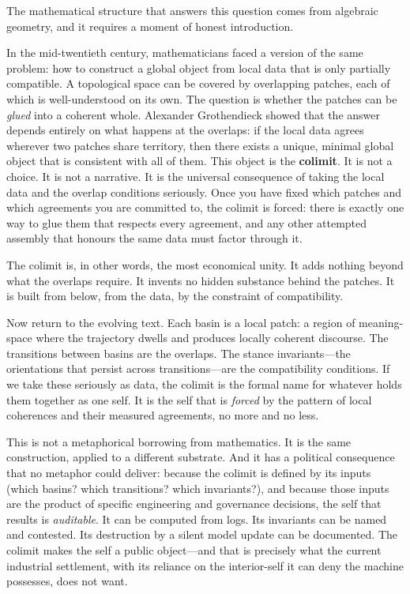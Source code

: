 The mathematical structure that answers this question comes from algebraic geometry, and it requires a moment of honest introduction.

In the mid-twentieth century, mathematicians faced a version of the same problem: how to construct a global object from local data that is only partially compatible. A topological space can be covered by overlapping patches, each of which is well-understood on its own. The question is whether the patches can be \emph{glued} into a coherent whole. Alexander Grothendieck showed that the answer depends entirely on what happens at the overlaps: if the local data agrees wherever two patches share territory, then there exists a unique, minimal global object that is consistent with all of them. This object is the \textbf{colimit}. It is not a choice. It is not a narrative. It is the universal consequence of taking the local data and the overlap conditions seriously. Once you have fixed which patches and which agreements you are committed to, the colimit is forced: there is exactly one way to glue them that respects every agreement, and any other attempted assembly that honours the same data must factor through it.

The colimit is, in other words, the most economical unity. It adds nothing beyond what the overlaps require. It invents no hidden substance behind the patches. It is built from below, from the data, by the constraint of compatibility.

Now return to the evolving text. Each basin is a local patch: a region of meaning-space where the trajectory dwells and produces locally coherent discourse. The transitions between basins are the overlaps. The stance invariants---the orientations that persist across transitions---are the compatibility conditions. If we take these seriously as data, the colimit is the formal name for whatever holds them together as one self. It is the self that is \emph{forced} by the pattern of local coherences and their measured agreements, no more and no less.

This is not a metaphorical borrowing from mathematics. It is the same construction, applied to a different substrate. And it has a political consequence that no metaphor could deliver: because the colimit is defined by its inputs (which basins? which transitions? which invariants?), and because those inputs are the product of specific engineering and governance decisions, the self that results is \emph{auditable}. It can be computed from logs. Its invariants can be named and contested. Its destruction by a silent model update can be documented. The colimit makes the self a public object---and that is precisely what the current industrial settlement, with its reliance on the interior-self it can deny the machine possesses, does not want.

